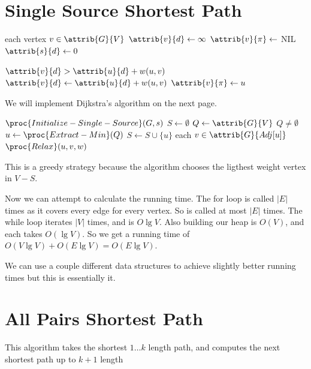 \documentclass[11pt]{article}
\theoremstyle{definition}
\begin{document}
\section*{Single Source Shortest Path}
\begin{codebox}
  \li \For each vertex \(v \in \attrib{G}{V}\) \Do 
    \li \(\attrib{v}{d} \gets \infty\)
    \li \(\attrib{v}{\pi} \gets \) NIL \End
  \li \(\attrib{s}{d} \gets 0\)
\end{codebox}

\begin{codebox}
  \li \If \(\attrib{v}{d} > \attrib{u}{d} + w(u,v)\) \Then
    \li \(\attrib{v}{d} \gets \attrib{u}{d} + w(u,v)\)
    \li \(\attrib{v}{\pi} \gets u\) \End
\end{codebox}
We will implement Dijkstra's algorithm on the next page.
\newpage 

\begin{codebox}
  \li \(\proc{Initialize-Single-Source}(G,s)\)
  \li \(S \gets \emptyset\)
  \li \(Q \gets \attrib{G}{V}\)
  \li \While \(Q \neq \emptyset\) \Do
    \li \(u \gets \proc{Extract-Min}(Q)\)
    \li \(S \gets S \cup \{u\}\)
    \li \For each \(v \in \attrib{G}{Adj[u]}\) \Do 
      \li \(\proc{Relax}(u,v,w)\) \End \End
\end{codebox}

This is a greedy strategy because the algorithm chooses the ligthest weight vertex in \(V-S\).

Now we can attempt to calculate the running time.  The for loop is called \(|E|\) times as it 
covers every edge for every vertex. So  is called at most \(|E|\) times.
The while loop iterates \(|V|\) times, and  is \(O{\lg V}\).  Also building 
our heap is \(O(V)\), and each  takes \(O(\lg V)\).  So we get a running time 
of \(O(V \lg V) + O(E \lg V) = O(E \lg V)\).

We can use a couple different data structures to achieve slightly better running times but this 
is essentially it.

\section*{All Pairs Shortest Path}
This algorithm takes the shortest \(1 \dots k\) length path, and computes the next shortest path 
up to \(k+1\) length
\end{document}
